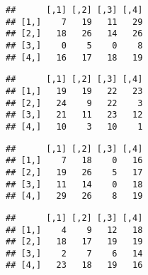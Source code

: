 \documentclass[]{article}
\newenvironment{Shaded}{\begin{snugshade}}{\end{snugshade}}
\newcommand{\KeywordTok}[1]{\textcolor[rgb]{0.13,0.29,0.53}{\textbf{#1}}}
\newcommand{\CommentTok}[1]{\textcolor[rgb]{0.56,0.35,0.01}{\textit{#1}}}
\newcommand{\OperatorTok}[1]{\textcolor[rgb]{0.81,0.36,0.00}{\textbf{#1}}}
\newcommand{\NormalTok}[1]{#1}
\begin{document}
\begin{verbatim}
##      [,1] [,2] [,3] [,4]
## [1,]    7   19   11   29
## [2,]   18   26   14   26
## [3,]    0    5    0    8
## [4,]   16   17   18   19
\end{verbatim}

\begin{Shaded}
\end{Shaded}

\begin{verbatim}
##      [,1] [,2] [,3] [,4]
## [1,]   19   19   22   23
## [2,]   24    9   22    3
## [3,]   21   11   23   12
## [4,]   10    3   10    1
\end{verbatim}

\begin{Shaded}
\end{Shaded}

\begin{verbatim}
##      [,1] [,2] [,3] [,4]
## [1,]    7   18    0   16
## [2,]   19   26    5   17
## [3,]   11   14    0   18
## [4,]   29   26    8   19
\end{verbatim}

\begin{Shaded}
\end{Shaded}

\begin{verbatim}
##      [,1] [,2] [,3] [,4]
## [1,]    4    9   12   18
## [2,]   18   17   19   19
## [3,]    2    7    6   14
## [4,]   23   18   19   16
\end{verbatim}

\begin{Shaded}
\end{Shaded}
\end{document}
